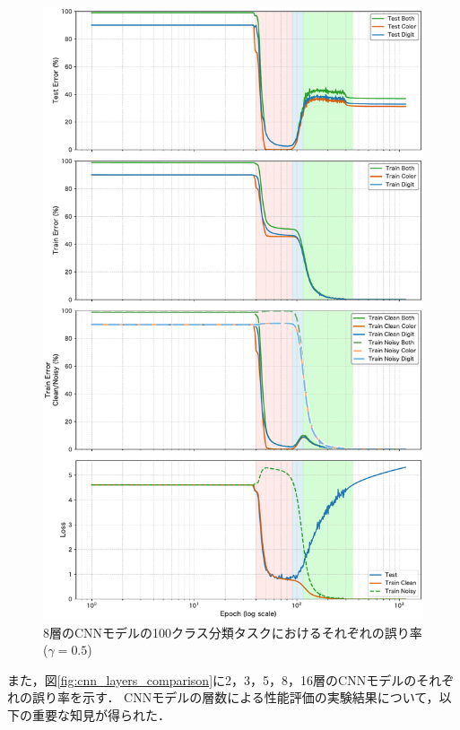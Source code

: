 \begin{figure}[H]
\begin{minipage}[t]{0.48\linewidth}
        \includegraphics[width=\linewidth]{fig/layer_comparison/cnn8_error_comp_layer.pdf}
        \caption{8層のCNNモデルの100クラス分類タスクにおけるそれぞれの誤り率($\gamma = 0.5$)}
        \label{fig:8layer_results}
    \end{minipage}
\end{figure}

また，図\ref{fig:cnn_layers_comparison}に2，3，5，8，16層のCNNモデルのそれぞれの誤り率を示す．
CNNモデルの層数による性能評価の実験結果について，以下の重要な知見が得られた．

